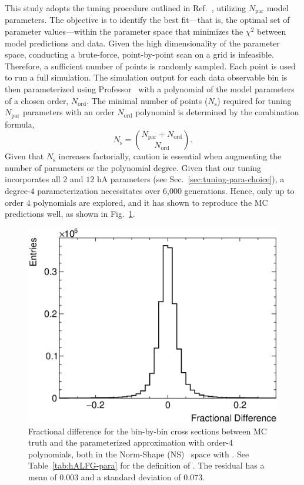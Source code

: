 This study adopts the tuning procedure outlined in Ref.~\cite{GENIE:2022qrc}, utilizing $N_{\textrm{par}}$ model parameters. 
The objective is to identify the best fit---that is, the optimal set of parameter values---within the parameter space that minimizes the $\chi^2$ between model predictions and data. 
Given the high dimensionality of the parameter space, conducting a brute-force, point-by-point scan on a grid is infeasible. 
Therefore, a sufficient number of points is randomly sampled. 
Each point is used to run a full simulation. 
The simulation output for each data observable bin is then parameterized using Professor~\cite{Buckley:2009bj} with a polynomial of the model parameters of a chosen order, $N_{\textrm{ord}}$. 
The minimal number of points ($N_{\textrm{s}}$) required for tuning $N_{\textrm{par}}$ parameters with an order $N_{\textrm{ord}}$ polynomial is determined by the combination formula,
\begin{equation}
    N_{\textrm{s}} = \binom{N_{\textrm{par}}+N_{\textrm{ord}}}{N_{\textrm{ord}}}.
\end{equation}
Given that $N_\textrm{s}$ increases factorially, caution is essential when augmenting the number of parameters or the polynomial degree. 
Given that our tuning incorporates all $2$ \sfcfg and $12$ hA parameters (see Sec.~\ref{sec:tuning-para-choice}), a degree-$4$ parameterization  necessitates over 6,000 generations. 
Hence, only up to order $4$ polynomials are explored, and it has shown to reproduce the MC predictions well, as shown in Fig.~\ref{fig:residual}. 

\begin{figure}[!htb] 	
    \centering 		
    \includegraphics[width=\sgfigwid\textwidth]{figures/tuning/residual.eps}
    \caption{\label{fig:residual} Fractional difference for the bin-by-bin cross sections between MC truth and the parameterized approximation with order-4 polynomials,  both in the Norm-Shape (NS)~\cite{DAgostini:1993arp,Hanson:2005mrg} space with \allpar. See Table~\ref{tab:hALFG-para} for the definition of \allpar. The residual has a mean of $0.003$ and a standard deviation of $0.073$.} 
\end{figure}

